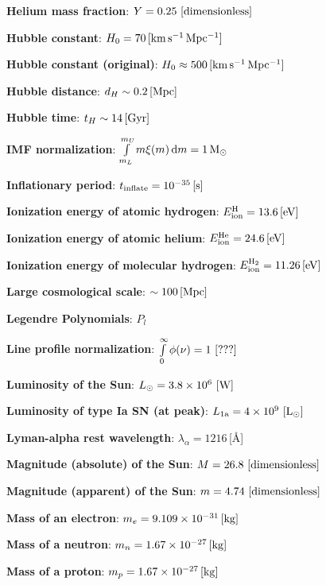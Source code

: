 \documentclass[a4paper,11pt]{article}
\begin{document}
{\noindent}\textbf{Helium mass fraction}: $Y = 0.25 ~ [{\rm dimensionless}]$

{\noindent}\textbf{Hubble constant}: $H_0 = 70\,[{\rm km\,s^{-1}\,Mpc^{-1}}]$

{\noindent}\textbf{Hubble constant (original)}: $H_0 \approx 500\,[{\rm km\,s^{-1}\,Mpc^{-1}}]$

{\noindent}\textbf{Hubble distance}: $d_H \sim 0.2\,[{\rm Mpc}]$

{\noindent}\textbf{Hubble time}: $t_H \sim 14\,[{\rm Gyr}]$

{\noindent}\textbf{IMF normalization}: $\int\limits_{m_L}^{m_U} m\xi(m)\,\mathrm{d}m = 1\,{\rm M}_\odot$

{\noindent}\textbf{Inflationary period}: $t_\mathrm{inflate} = 10^{-35}\,[{\rm s}]$

{\noindent}\textbf{Ionization energy of atomic hydrogen}: $E_\mathrm{ion}^\mathrm{H} = 13.6\,[{\rm eV}]$

{\noindent}\textbf{Ionization energy of atomic helium}: $E_\mathrm{ion}^\mathrm{He} = 24.6\,[{\rm eV}]$

{\noindent}\textbf{Ionization energy of molecular hydrogen}: $E_\mathrm{ion}^\mathrm{H_2} = 11.26\,[{\rm eV}]$

{\noindent}\textbf{Large cosmological scale}: $\sim 100\,[{\rm Mpc}]$

{\noindent}\textbf{Legendre Polynomials}: $P_l$

{\noindent}\textbf{Line profile normalization}: $\int\limits_0^\infty \phi(\nu)=1 ~ [{\rm ???}]$

{\noindent}\textbf{Luminosity of the Sun}: $L_\odot=3.8\times10^6 ~ [{\rm W}]$

{\noindent}\textbf{Luminosity of type Ia SN (at peak)}: $L_\mathrm{1a}=4\times10^9 ~ [{\rm L_\odot}]$

{\noindent}\textbf{Lyman-alpha rest wavelength}: $\lambda_\alpha = 1216$\,[\AA]

{\noindent}\textbf{Magnitude (absolute) of the Sun}: $M = 26.8 ~ [{\rm dimensionless}]$

{\noindent}\textbf{Magnitude (apparent) of the Sun}: $m = 4.74 ~ [{\rm dimensionless}]$

{\noindent}\textbf{Mass of an electron}: $m_e = 9.109\times10^{-31}\,[{\rm kg}]$

{\noindent}\textbf{Mass of a neutron}: $m_n = 1.67\times10^{-27}\,[{\rm kg}]$

{\noindent}\textbf{Mass of a proton}: $m_p = 1.67\times10^{-27}\,[{\rm kg}]$
\end{document}
